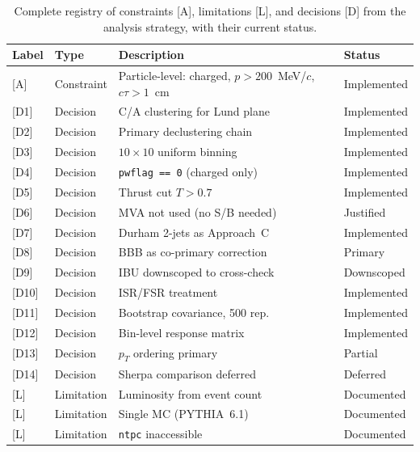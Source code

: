 \documentclass[11pt,a4paper]{article}
\begin{document}
\begin{table}[htbp]
\centering
\caption{Complete registry of constraints [A], limitations [L],
  and decisions [D] from the analysis strategy, with their current
  status.}
\label{tbl:limitation-index}
\begin{tabular}{llp{6cm}l}
\toprule
Label & Type & Description & Status \\
\midrule
{[A]} & Constraint & Particle-level: charged, $p > 200$~MeV/$c$,
  $c\tau > 1$~cm & Implemented \\
{[D1]} & Decision & C/A clustering for Lund plane & Implemented \\
{[D2]} & Decision & Primary declustering chain & Implemented \\
{[D3]} & Decision & $10 \times 10$ uniform binning & Implemented \\
{[D4]} & Decision & \texttt{pwflag == 0} (charged only) & Implemented \\
{[D5]} & Decision & Thrust cut $T > 0.7$ & Implemented \\
{[D6]} & Decision & MVA not used (no S/B needed) & Justified \\
{[D7]} & Decision & Durham 2-jets as Approach~C & Implemented \\
{[D8]} & Decision & BBB as co-primary correction & Primary \\
{[D9]} & Decision & IBU downscoped to cross-check & Downscoped \\
{[D10]} & Decision & ISR/FSR treatment & Implemented \\
{[D11]} & Decision & Bootstrap covariance, 500 rep. & Implemented \\
{[D12]} & Decision & Bin-level response matrix & Implemented \\
{[D13]} & Decision & $p_T$ ordering primary & Partial \\
{[D14]} & Decision & Sherpa comparison deferred & Deferred \\
{[L]} & Limitation & Luminosity from event count & Documented \\
{[L]} & Limitation & Single MC (PYTHIA~6.1) & Documented \\
{[L]} & Limitation & \texttt{ntpc} inaccessible & Documented \\
\bottomrule
\end{tabular}
\end{table}

\end{document}
